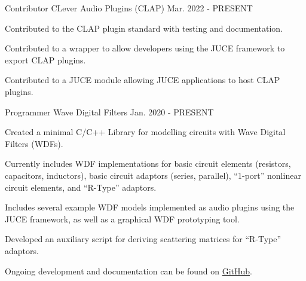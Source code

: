 \begin{cventries}
  \cventry
    {Contributor} %
    {CLever Audio Plugins (CLAP)} %
    {} %
    {Mar. 2022 - PRESENT} %
    {
      \begin{cvitems} %
        \item {Contributed to the CLAP plugin standard with testing and documentation.}
        \item {Contributed to a wrapper to allow developers using the JUCE framework to export CLAP plugins.}
        \item {Contributed to a JUCE module allowing JUCE applications to host CLAP plugins.}
      \end{cvitems}
    }


  \cventry
    {Programmer} %
    {Wave Digital Filters} %
    {} %
    {Jan. 2020 - PRESENT} %
    {
      \begin{cvitems} %
        \item {Created a minimal C/C++ Library for modelling circuits with Wave Digital Filters (WDFs).}
        \item {Currently includes WDF implementations for basic circuit elements (resistors, capacitors, inductors),
               basic circuit adaptors (series, parallel), ``1-port'' nonlinear circuit elements, and ``R-Type'' adaptors.}
        \item {Includes several example WDF models implemented as audio plugins using the JUCE framework,
               as well as a graphical WDF prototyping tool.}
        \item {Developed an auxiliary script for deriving scattering matrices for ``R-Type'' adaptors.}
        \item {Ongoing development and documentation can be found on \href{https://github.com/jatinchowdhury18/WaveDigitalFilters}{GitHub}.}
      \end{cvitems}
    }



\end{cventries}
